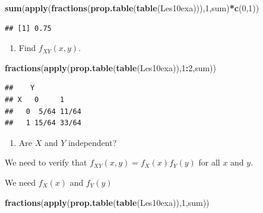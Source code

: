 \documentclass[]{book}
\newenvironment{Shaded}{\begin{snugshade}}{\end{snugshade}}
\newcommand{\KeywordTok}[1]{\textcolor[rgb]{0.13,0.29,0.53}{\textbf{#1}}}
\newcommand{\DecValTok}[1]{\textcolor[rgb]{0.00,0.00,0.81}{#1}}
\newcommand{\OperatorTok}[1]{\textcolor[rgb]{0.81,0.36,0.00}{\textbf{#1}}}
\newcommand{\NormalTok}[1]{#1}
\providecommand{\tightlist}{%
  \setlength{\itemsep}{0pt}\setlength{\parskip}{0pt}}
\theoremstyle{definition}
\theoremstyle{definition}
\theoremstyle{definition}
\theoremstyle{remark}
\begin{document}
\begin{Shaded}
\begin{Highlighting}[]
\KeywordTok{sum}\NormalTok{(}\KeywordTok{apply}\NormalTok{(}\KeywordTok{fractions}\NormalTok{(}\KeywordTok{prop.table}\NormalTok{(}\KeywordTok{table}\NormalTok{(Les10exa))),}\DecValTok{1}\NormalTok{,sum)}\OperatorTok{*}\KeywordTok{c}\NormalTok{(}\DecValTok{0}\NormalTok{,}\DecValTok{1}\NormalTok{))}
\end{Highlighting}
\end{Shaded}

\begin{verbatim}
## [1] 0.75
\end{verbatim}

\begin{enumerate}
\def\labelenumi{\arabic{enumi}.}
\setcounter{enumi}{3}
\tightlist
\item
  Find \(f_{XY}(x,y)\).
\end{enumerate}

\begin{Shaded}
\begin{Highlighting}[]
\KeywordTok{fractions}\NormalTok{(}\KeywordTok{apply}\NormalTok{(}\KeywordTok{prop.table}\NormalTok{(}\KeywordTok{table}\NormalTok{(Les10exa)),}\DecValTok{1}\OperatorTok{:}\DecValTok{2}\NormalTok{,sum))}
\end{Highlighting}
\end{Shaded}

\begin{verbatim}
##    Y
## X   0     1    
##   0  5/64 11/64
##   1 15/64 33/64
\end{verbatim}

\begin{enumerate}
\def\labelenumi{\arabic{enumi}.}
\setcounter{enumi}{4}
\tightlist
\item
  Are \(X\) and \(Y\) independent?
\end{enumerate}

We need to verify that \(f_{XY}(x,y)=f_{X}(x)f_{Y}(y)\) for all \(x\)
and \(y\).

We need \(f_{X}(x)\) and \(f_{Y}(y)\)

\begin{Shaded}
\begin{Highlighting}[]
\KeywordTok{fractions}\NormalTok{(}\KeywordTok{apply}\NormalTok{(}\KeywordTok{prop.table}\NormalTok{(}\KeywordTok{table}\NormalTok{(Les10exa)),}\DecValTok{1}\NormalTok{,sum))}
\end{Highlighting}
\end{Shaded}
\end{document}

